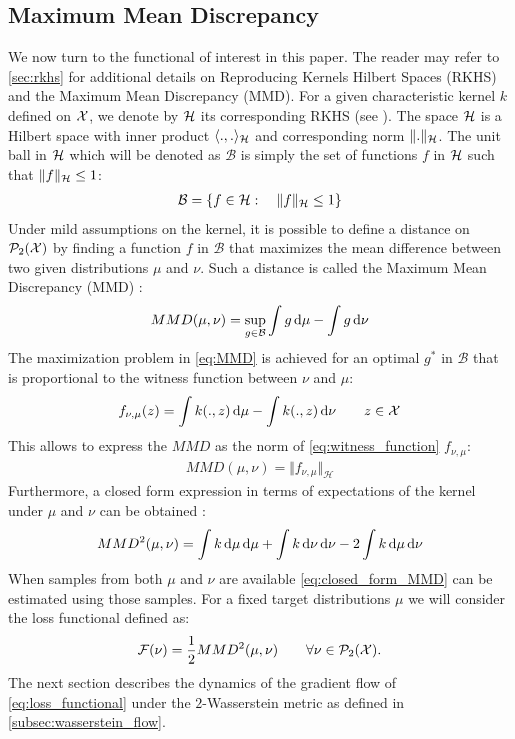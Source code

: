 \subsection{Maximum Mean Discrepancy}\label{subsec:MMD}
We now turn to the functional of interest in this paper. The reader may refer to \cref{sec:rkhs} for additional details on Reproducing Kernels Hilbert Spaces (RKHS) and the Maximum Mean Discrepancy (MMD). For a given characteristic kernel $k$ defined on ${{\mathcal X}}$, we denote by ${{\mathcal H}}$ its corresponding RKHS (see \cite{smola1998learning}). The space ${{\mathcal H}}$ is a Hilbert space with inner product $\langle .,. \rangle_{{{\mathcal H}}}$ and corresponding norm $\Vert . \Vert_{{{\mathcal H}}}$. The unit ball in ${{\mathcal H}}$ which will be denoted as $\mathcal{B}$ is simply the set of functions $f$ in ${{\mathcal H}}$ such that $\Vert f\Vert_{{{\mathcal H}}}\leq 1 $:
\begin{align}\label{eq:unit_ball_RKHS}
\mathcal{B} = \{ f\in {{\mathcal H}} : \quad \Vert f\Vert_{{{\mathcal H}}}\leq 1 \}
\end{align}
Under mild assumptions on the kernel, it is possible to define a distance on $\mathcal{P}_2({{\mathcal X}})$ by finding a function $f$ in $\mathcal{B}$ that maximizes the mean difference between two given distributions $\mu$ and $\nu$. Such a distance is called the Maximum Mean Discrepancy  (MMD) \cite{Gretton:2012}:
\begin{align}\label{eq:MMD}
MMD(\mu,\nu) = \sup_{g\in \mathcal{B}} \int g\mathop{}\!\mathrm{d}\mu - \int g \mathop{}\!\mathrm{d}\nu
\end{align}
The maximization problem in \cref{eq:MMD} is achieved for an optimal $g^*$ in $\mathcal{B}$ that is proportional to the  witness function between $\nu$ and $\mu$:
\begin{align}\label{eq:witness_function}
f_{\nu,\mu}(z) = \int k(.,z)\mathop{}\!\mathrm{d} \mu - \int k(.,z)\mathop{}\!\mathrm{d} \nu  \qquad z\in {{\mathcal X}}
\end{align}
This allows to express the $MMD$ as the norm of \cref{eq:witness_function} $f_{\nu,\mu}$:
\begin{align}\label{eq:mmd_norm_witness}
MMD(\mu,\nu) = \Vert f_{\nu,\mu} \Vert_{\mathcal{H}} 
\end{align}
Furthermore, a closed form expression in terms of expectations of the kernel under $\mu$ and $\nu$ can be obtained \cite{gretton2012kernel}:
\begin{align}\label{eq:closed_form_MMD}
MMD^2(\mu,\nu) = \int k\mathop{}\!\mathrm{d}\mu \mathop{}\!\mathrm{d}\mu + \int k\mathop{}\!\mathrm{d}\nu \mathop{}\!\mathrm{d} \nu - 2\int k\mathop{}\!\mathrm{d}\mu \mathop{}\!\mathrm{d} \nu
\end{align}
When samples from both $\mu$ and $\nu$ are available \cref{eq:closed_form_MMD} can be estimated using those samples. For a fixed target distributions $\mu$ we will consider the loss functional defined as:
\begin{align}\label{eq:loss_functional}
{{\mathcal F}}(\nu) = \frac{1}{2} MMD^2(\mu,\nu) \qquad \forall \nu \in \mathcal{P}_2({{\mathcal X}}).
\end{align}
The next section describes the dynamics of the gradient flow of \cref{eq:loss_functional} under the $2$-Wasserstein metric as defined in \cref{subsec:wasserstein_flow}.
